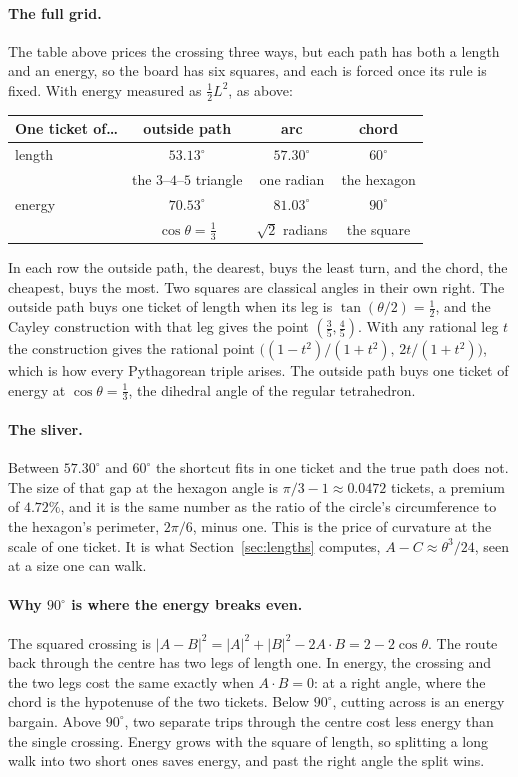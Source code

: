 \documentclass[11pt]{article}
\begin{document}
\paragraph{The full grid.} The table above prices the crossing three ways, but each
path has both a length and an energy, so the board has six squares, and each is forced
once its rule is fixed. With energy measured as $\tfrac12L^2$, as above:
\begin{center}\small
\begin{tabular}{lccc}\toprule
One ticket of\ldots & outside path & arc & chord \\ \midrule
length & $53.13^\circ$ & $57.30^\circ$ & $60^\circ$ \\
 & the $3$--$4$--$5$ triangle & one radian & the hexagon \\[2pt]
energy & $70.53^\circ$ & $81.03^\circ$ & $90^\circ$ \\
 & $\cos\theta=\tfrac13$ & $\sqrt2$ radians & the square \\
\bottomrule\end{tabular}
\end{center}
In each row the outside path, the dearest, buys the least turn, and the chord, the
cheapest, buys the most. Two squares are classical angles in their own right. The
outside path buys one ticket of length when its leg is $\tan(\theta/2)=\tfrac12$, and the
Cayley construction with that leg gives the point $(\tfrac35,\tfrac45)$. With any rational
leg $t$ the construction gives the rational point $\bigl((1-t^2)/(1+t^2),\,2t/(1+t^2)\bigr)$,
which is how every Pythagorean triple arises. The outside path buys one ticket of energy at
$\cos\theta=\tfrac13$, the dihedral angle of the regular tetrahedron.

\paragraph{The sliver.} Between $57.30^\circ$ and $60^\circ$ the shortcut fits in one
ticket and the true path does not. The size of that gap at the hexagon angle is
$\pi/3-1\approx0.0472$ tickets, a premium of $4.72\%$, and it is the same number as the
ratio of the circle's circumference to the hexagon's perimeter, $2\pi/6$, minus one. This
is the price of curvature at the scale of one ticket. It is what Section~\ref{sec:lengths}
computes, $A-C\approx\theta^3/24$, seen at a size one can walk.

\paragraph{Why $90^\circ$ is where the energy breaks even.} The squared crossing is
$|A-B|^2=|A|^2+|B|^2-2A\cdot B=2-2\cos\theta$. The route back through the centre has two
legs of length one. In energy, the crossing and the two legs cost the same exactly when
$A\cdot B=0$: at a right angle, where the chord is the hypotenuse of the two tickets.
Below $90^\circ$, cutting across is an energy bargain. Above $90^\circ$, two separate trips
through the centre cost less energy than the single crossing. Energy grows with the
square of length, so splitting a long walk into two short ones saves energy, and past the
right angle the split wins.
\end{document}
